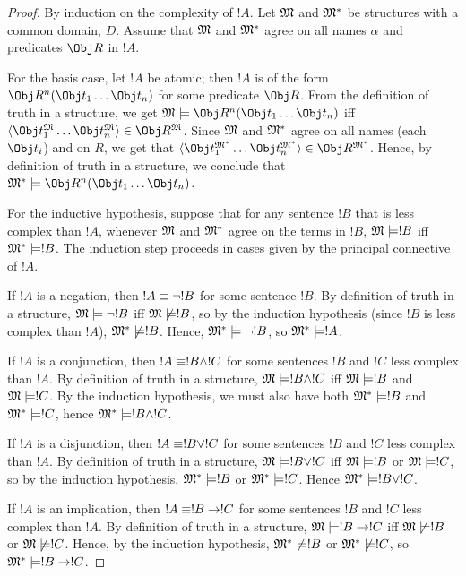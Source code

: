 \documentclass[syntax-and-semantics]{subfiles}
\begin{document}
\begin{proof} By induction on the complexity of $!A$. Let $\mathfrak{M}$ and $\mathfrak{M}^*$ be structures with a common domain, $D$. Assume that $\mathfrak{M}$ and $\mathfrak{M}^*$ agree on all names $\alpha$ and predicates $\Obj R$ in $!A$.

For the basis case, let $!A$ be atomic; then $!A$ is of the form $\Obj R^n(\Obj t_1 \ldots \Obj t_n)$ for some predicate $\Obj R$. From the definition of truth in a structure, we get $\Struct{M} \Sat \Obj R^n(\Obj t_1 \ldots \Obj t_n)$ iff $\langle \Obj t_1^\Struct{M} \ldots \Obj t_n^\Struct{M} \rangle \in \Obj R^\Struct{M}$. Since $\mathfrak{M}$ and $\mathfrak{M}^*$ agree on all names (each $\Obj t_i$) and on $R$, we get that $\langle \Obj t_1^{\Struct{M}^*} \ldots \Obj t_n^{\Struct{M}^*} \rangle \in \Obj R^{\Struct{M}^*}$. Hence, by definition of truth in a structure, we conclude that $\Struct{M}^* \Sat \Obj R^n(\Obj t_1 \ldots \Obj t_n)$. 

For the inductive hypothesis, suppose that for any sentence $!B$ that is less complex than $!A$, whenever $\mathfrak{M}$ and $\mathfrak{M}^*$ agree on the terms in $!B$, $\mathfrak{M} \models !B$ iff $\mathfrak{M}^* \models !B$. The induction step proceeds in cases given by the principal connective of $!A$.

If $!A$ is a negation, then $!A \equiv \lnot !B$ for some sentence $!B$. By definition of truth in a structure, $\mathfrak{M} \models \lnot !B$ iff $\mathfrak{M} \not\models !B$, so by the induction hypothesis (since $!B$ is less complex than $!A$), $\mathfrak{M}^* \not\models !B$. Hence, $\mathfrak{M}^* \models \lnot !B$, so $\mathfrak{M}^* \models !A$.

If $!A$ is a conjunction, then $!A \equiv !B \land !C$ for some sentences $!B$ and $!C$ less complex than $!A$. By definition of truth in a structure, $\mathfrak{M} \models !B \land !C$ iff $\mathfrak{M} \models !B$ and $\mathfrak{M} \models !C$. By the induction hypothesis, we must also have both $\mathfrak{M}^* \models !B$ and $\mathfrak{M}^* \models !C$, hence $\mathfrak{M}^* \models !B \land !C$.

If $!A$ is a disjunction, then $!A \equiv !B \lor !C$ for some sentences $!B$ and $!C$ less complex than $!A$. By definition of truth in a structure, $\mathfrak{M} \models !B \lor !C$ iff $\mathfrak{M} \models !B$ or $\mathfrak{M} \models !C$, so by the induction hypothesis, $\mathfrak{M}^* \models !B$ or $\mathfrak{M}^* \models !C$. Hence $\mathfrak{M}^* \models !B \lor !C$. 

If $!A$ is an implication, then $!A \equiv !B \to !C$ for some sentences $!B$ and $!C$ less complex than $!A$. By definition of truth in a structure, $\mathfrak{M} \models !B \to !C$ iff $\mathfrak{M} \not\models !B$ or $\mathfrak{M} \not\models !C$. Hence, by the induction hypothesis, $\mathfrak{M}^* \not\models !B$ or $\mathfrak{M}^* \not\models !C$, so $\mathfrak{M}^* \models !B \to !C$.


\end{proof}
\end{document}
